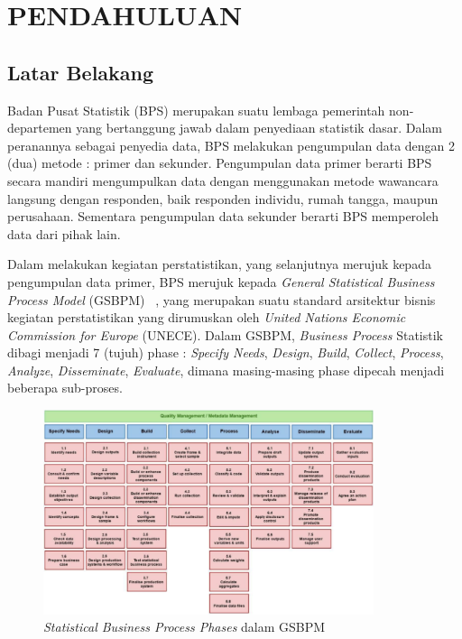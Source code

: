 \chapter{PENDAHULUAN}
\section{Latar Belakang}
Badan Pusat Statistik (BPS) merupakan suatu lembaga pemerintah non-departemen yang bertanggung jawab dalam penyediaan statistik dasar. Dalam peranannya sebagai penyedia data, BPS melakukan pengumpulan data dengan 2 (dua) metode : primer dan sekunder. Pengumpulan data primer berarti BPS secara mandiri mengumpulkan data dengan menggunakan metode wawancara langsung dengan responden, baik responden individu, rumah tangga, maupun perusahaan. Sementara pengumpulan data sekunder berarti BPS memperoleh data dari pihak lain.

Dalam melakukan kegiatan perstatistikan, yang selanjutnya merujuk kepada pengumpulan data primer, BPS merujuk kepada \textit{General Statistical Business Process Model} (GSBPM) ~\cite{_gsbpm_????}, yang merupakan suatu standard arsitektur bisnis kegiatan perstatistikan yang dirumuskan oleh \textit{United Nations Economic Commission for Europe} (UNECE). Dalam GSBPM, \textit{Business Process} Statistik dibagi menjadi 7 (tujuh) phase : \textit{Specify Needs}, \textit{Design}, \textit{Build}, \textit{Collect}, \textit{Process}, \textit{Analyze}, \textit{Disseminate}, \textit{Evaluate}, dimana masing-masing phase dipecah menjadi beberapa sub-proses.

\begin{figure}
    \centering
    \includegraphics[height=6cm]{images/GSBPM}
    \caption{\textit{Statistical Business Process Phases} dalam GSBPM}
    \label{fig:gsbpm}
\end{figure}

